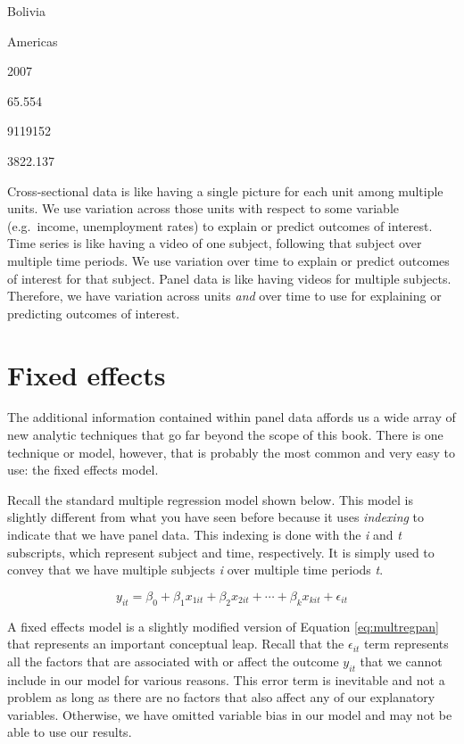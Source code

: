 \documentclass[
]{book}
\begin{document}
Bolivia

Americas

2007

65.554

9119152

3822.137

Cross-sectional data is like having a single picture for each unit among multiple units. We use variation across those units with respect to some variable (e.g.~income, unemployment rates) to explain or predict outcomes of interest. Time series is like having a video of one subject, following that subject over multiple time periods. We use variation over time to explain or predict outcomes of interest for that subject. Panel data is like having videos for multiple subjects. Therefore, we have variation across units \emph{and} over time to use for explaining or predicting outcomes of interest.

\hypertarget{fixed-effects}{%
\section{Fixed effects}\label{fixed-effects}}

The additional information contained within panel data affords us a wide array of new analytic techniques that go far beyond the scope of this book. There is one technique or model, however, that is probably the most common and very easy to use: the fixed effects model.

Recall the standard multiple regression model shown below. This model is slightly different from what you have seen before because it uses \emph{indexing} to indicate that we have panel data. This indexing is done with the \emph{i} and \emph{t} subscripts, which represent subject and time, respectively. It is simply used to convey that we have multiple subjects \emph{i} over multiple time periods \emph{t}.

\begin{equation}
y_{it}=\beta_0+\beta_1x_{1it}+\beta_2x_{2it}+\cdots+\beta_kx_{kit}+\epsilon_{it}
\label{eq:multregpan}
\end{equation}

A fixed effects model is a slightly modified version of Equation \eqref{eq:multregpan} that represents an important conceptual leap. Recall that the \(\epsilon_{it}\) term represents all the factors that are associated with or affect the outcome \(y_{it}\) that we cannot include in our model for various reasons. This error term is inevitable and not a problem as long as there are no factors that also affect any of our explanatory variables. Otherwise, we have omitted variable bias in our model and may not be able to use our results.
\end{document}
